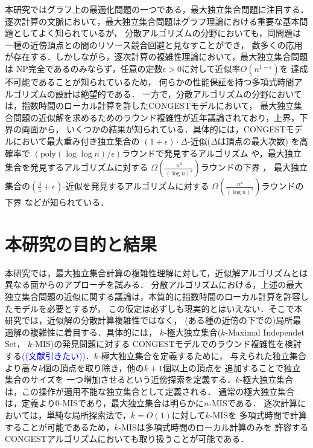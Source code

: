 \documentclass[12pt]{thesis}
\newcommand{\Izumi}[1]{\textcolor{blue}{(#1)}}
\newcommand{\CONGEST}{\textsf{CONGEST}}
\theoremstyle{definition}
\begin{document}
本研究ではグラフ上の最適化問題の一つである，最大独立集合問題に注目する．
逐次計算の文脈において，最大独立集合問題はグラフ理論における重要な基本問題としてよく知られているが，
分散アルゴリズムの分野においても，同問題は一種の近傍頂点との間のリソース競合回避と見なすことができ，
数多くの応用が存在する．しかしながら，逐次計算の複雑性理論において，最大独立集合問題は
NP完全であるのみならず，任意の定数$\epsilon > 0$に対して近似率$O(n^{1-\epsilon})$を
達成不可能であることが知られているため，
何らかの性能保証を持つ多項式時間アルゴリズムの設計は絶望的である\cite{haastad1999clique}．
一方で，分散アルゴリズムの分野においては，指数時間のローカル計算を許した{\CONGEST}モデルにおいて，
最大独立集合問題の近似解を求めるためのラウンド複雑性が近年議論されており，上界，下界の両面から，
いくつかの結果が知られている．具体的には，{\CONGEST}モデルにおいて最大重み付き独立集合の
$(1 + \epsilon) \cdot \Delta$-近似($\Delta$は頂点の最大次数) を高確率で
$\left(\mathrm{poly}(\log \log n)/\epsilon \right)$ラウンドで発見するアルゴリズム
\cite{kawarabayashi2019improved} や，最大独立集合を発見するアルゴリズムに対する
$\Omega \left(\frac{n^{2}}{(\log n)^{2}}\right)$ラウンドの下界 \cite{censor2017quadratic}，
最大独立集合の$(\frac{3}{4} + \epsilon)$-近似を発見するアルゴリズムに対する
$\Omega \left(\frac{n^{2}}{(\log n)^{3}}\right)$ラウンドの下界 \cite{efron2020beyond} などが知られている．

\section{本研究の目的と結果}
本研究では，最大独立集合計算の複雑性理解に対して，近似解アルゴリズムとは異なる面からのアプローチを試みる．
分散アルゴリズムにおける，上述の最大独立集合問題の近似に関する議論は，本質的に指数時間のローカル計算を許容したモデルを必要とするが，
この仮定は必ずしも現実的とはいえない．そこで本研究では，近似解の分散計算複雑性ではなく，
(ある種の近傍の下での)局所最適解の複雑性に着目する．具体的には，
$k$-極大独立集合($k$-Maximal Independet Set， $k$-MIS)の発見問題に対する
{\CONGEST}モデルでのラウンド複雑性を検討する\cite{}\Izumi{(文献引きたい)}．$k$-極大独立集合を定義するために，
与えられた独立集合より高々$k$個の頂点を取り除き，他の$k+1$個以上の頂点を
追加することで独立集合のサイズを
一つ増加させるという近傍探索を定義する．$k$-極大独立集合は，この操作が適用不能な独立集合として定義される．
通常の極大独立集合は，定義より$0$-MISであり，最大独立集合は明らかに$n$-MISである．
逐次計算においては，単純な局所探索法で，$k=O(1)$に対して$k$-MISを
多項式時間で計算することが可能であるため，$k$-MISは多項式時間のローカル計算のみを
許容する{\CONGEST}アルゴリズムにおいても取り扱うことが可能である．
\end{document}
